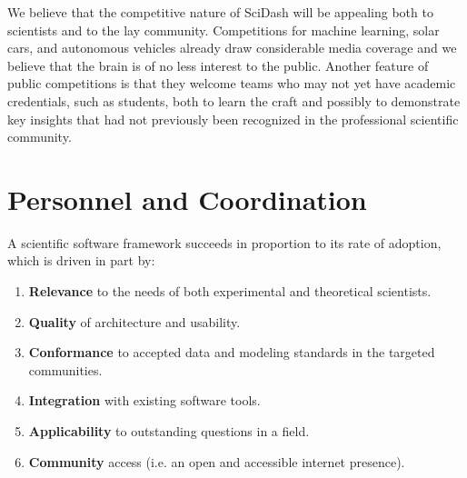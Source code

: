 \documentclass[11pt,letterpaper]{article}
\begin{document}
We believe that the competitive nature of SciDash will be appealing both to scientists and to the lay community.  Competitions for machine learning, solar cars, and autonomous vehicles already draw considerable media coverage and we believe that the brain is of no less interest to the public.  Another feature of public competitions is that they welcome teams who may not yet have academic credentials, such as students, both to learn the craft and possibly to demonstrate key insights that had not previously been recognized in the professional scientific community.  

\section{Personnel and Coordination}
\renewcommand{\theenumi}{\alph{enumi}}
A scientific software framework succeeds in proportion to its rate of adoption, which is driven in part by:
\begin{enumerate}
\item \textbf{Relevance} to the needs of both experimental and theoretical scientists.
\item \textbf{Quality} of architecture and usability.
\item \textbf{Conformance} to accepted data and modeling standards in the targeted communities.
\item \textbf{Integration} with existing software tools.  
\item \textbf{Applicability} to outstanding questions in a field.
\item \textbf{Community} access (i.e. an open and accessible internet presence).  
\end{enumerate}
\end{document}
